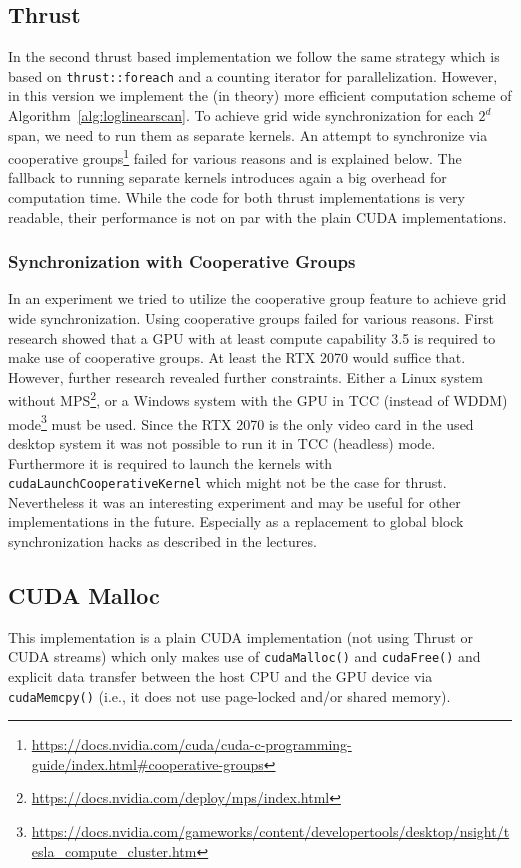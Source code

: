 \subsection{Thrust}
In the second thrust based implementation we follow the same strategy which is based on \texttt{thrust::foreach} and a counting iterator for parallelization. However, in this version we implement the (in theory) more efficient computation scheme of Algorithm~\ref{alg:loglinearscan}. To achieve grid wide synchronization for each $2^d$ span, we need to run them as separate kernels. An attempt to synchronize via cooperative groups\footnote{\url{https://docs.nvidia.com/cuda/cuda-c-programming-guide/index.html\#cooperative-groups}} failed for various reasons and is explained below. The fallback to running separate kernels introduces again a big overhead for computation time. While the code for both thrust implementations is very readable, their performance is not on par with the plain CUDA implementations.

\subsubsection{Synchronization with Cooperative Groups}
In an experiment we tried to utilize the cooperative group feature to achieve grid wide synchronization. Using cooperative groups failed for various reasons. First research showed that a GPU with at least compute capability 3.5 is required to make use of cooperative groups. At least the RTX 2070 would suffice that. However, further research revealed further constraints. Either a Linux system without MPS\footnote{\url{https://docs.nvidia.com/deploy/mps/index.html}}, or a Windows system with the GPU in TCC (instead of WDDM) mode\footnote{\url{https://docs.nvidia.com/gameworks/content/developertools/desktop/nsight/tesla_compute_cluster.htm}} must be used. Since the RTX 2070 is the only video card in the used desktop system it was not possible to run it in TCC (headless) mode. Furthermore it is required to launch the kernels with \texttt{cudaLaunchCooperativeKernel} which might not be the case for thrust. Nevertheless it was an interesting experiment and may be useful for other implementations in the future. Especially as a replacement to global block synchronization hacks as described in the lectures. 

\subsection{CUDA Malloc}
\label{sec:cuda_malloc}
This implementation is a plain CUDA implementation (not using Thrust or CUDA streams) which only makes use of \texttt{cudaMalloc()} and \texttt{cudaFree()} and explicit data transfer between the host CPU and the GPU device via \texttt{cudaMemcpy()} (i.e., it does not use page-locked and/or shared memory).

